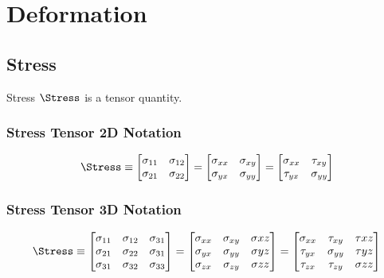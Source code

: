 \chapter{Deformation}

\section{Stress}

Stress $\Stress$ is a tensor quantity.

\subsection{Stress Tensor 2D Notation}

\begin{equation}
     \Stress \equiv 
     \begin{bmatrix} 
        \sigma_{11} & \sigma_{12} \\
        \sigma_{21} & \sigma_{22} \\
    \end{bmatrix}
    =
    \begin{bmatrix} 
        \sigma_{xx} & \sigma_{xy} \\
        \sigma_{yx} & \sigma_{yy} \\
    \end{bmatrix} 
    = 
    \begin{bmatrix} 
        \sigma_{xx} & \tau_{xy} \\
        \tau_{yx} & \sigma_{yy} \\
    \end{bmatrix} 
\end{equation}

\subsection{Stress Tensor 3D Notation}

\begin{equation}
     \Stress \equiv 
     \begin{bmatrix} 
        \sigma_{11} & \sigma_{12} & \sigma_{31} \\
        \sigma_{21} & \sigma_{22} & \sigma_{31} \\
        \sigma_{31} & \sigma_{32} & \sigma_{33} \\
    \end{bmatrix}
    =
    \begin{bmatrix} 
        \sigma_{xx} & \sigma_{xy} & \sigma{xz} \\
        \sigma_{yx} & \sigma_{yy} & \sigma{yz} \\
        \sigma_{zx} & \sigma_{zy} & \sigma{zz} \\
    \end{bmatrix} 
    = 
    \begin{bmatrix} 
        \sigma_{xx} & \tau_{xy} & \tau{xz} \\
        \tau_{yx} & \sigma_{yy} & \tau{yz} \\
        \tau_{zx} & \tau_{zy} & \sigma{zz} \\
    \end{bmatrix} 
\end{equation}


